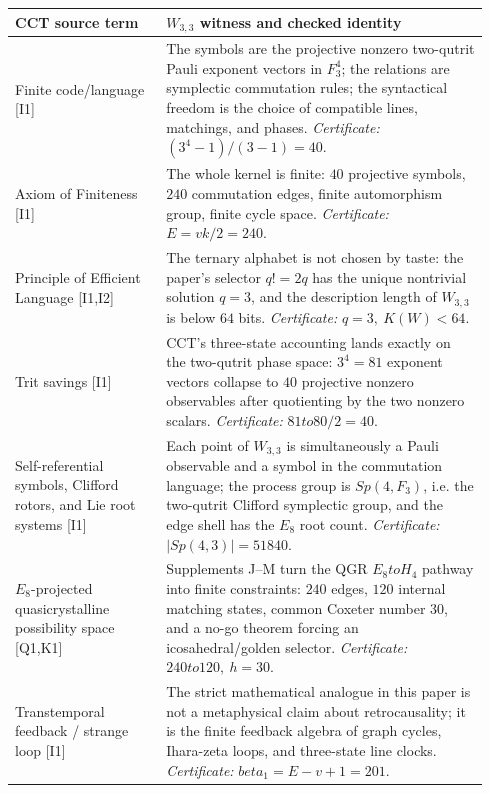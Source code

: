 \documentclass[12pt,a4paper]{article}
\def\mathbb#1{#1}%
\def\mathrm#1{#1}%
\def\beta{beta}%
\def\to{ to }%
\theoremstyle{definition}
\newcommand{\Sp}{\mathrm{Sp}}
\newcommand{\FF}{\mathbb{F}}
\begin{document}
{\small
\renewcommand{\arraystretch}{1.18}
\begin{longtable}{@{}>{\raggedright\arraybackslash}p{0.30\linewidth}>{\raggedright\arraybackslash}p{0.64\linewidth}@{}}
\toprule
CCT source term & $W_{3,3}$ witness and checked identity \\
\midrule \endhead
Finite code/language [I1]
&
The symbols are the projective nonzero two-qutrit Pauli exponent
vectors in $\FF_3^4$; the relations are symplectic commutation rules;
the syntactical freedom is the choice of compatible lines, matchings,
and phases.  \emph{Certificate:} $(3^4-1)/(3-1)=40$. \\

Axiom of Finiteness [I1]
&
The whole kernel is finite: $40$ projective symbols, $240$ commutation
edges, finite automorphism group, finite cycle space.  \emph{Certificate:}
$E=vk/2=240$. \\

Principle of Efficient Language [I1,I2]
&
The ternary alphabet is not chosen by taste: the paper's selector
$q!=2q$ has the unique nontrivial solution $q=3$, and the
description length of $W_{3,3}$ is below $64$ bits.  \emph{Certificate:}
$q=3,\ K(W)<64$. \\

Trit savings [I1]
&
CCT's three-state accounting lands exactly on the two-qutrit phase
space: $3^4=81$ exponent vectors collapse to $40$ projective nonzero
observables after quotienting by the two nonzero scalars.  \emph{Certificate:}
$81\to 80/2=40$. \\

Self-referential symbols, Clifford rotors, and Lie root systems [I1]
&
Each point of $W_{3,3}$ is simultaneously a Pauli observable and a
symbol in the commutation language; the process group is
$\Sp(4,\FF_3)$, i.e. the two-qutrit Clifford symplectic group, and the
edge shell has the $E_8$ root count.  \emph{Certificate:}
$|\Sp(4,3)|=51840$. \\

$E_8$-projected quasicrystalline possibility space [Q1,K1]
&
Supplements J--M turn the QGR $E_8\to H_4$ pathway into finite
constraints: $240$ edges, $120$ internal matching states, common
Coxeter number $30$, and a no-go theorem forcing an icosahedral/golden
selector.  \emph{Certificate:} $240\to 120,\ h=30$. \\

Transtemporal feedback / strange loop [I1]
&
The strict mathematical analogue in this paper is not a metaphysical
claim about retrocausality; it is the finite feedback algebra of graph
cycles, Ihara-zeta loops, and three-state line clocks.  \emph{Certificate:}
$\beta_1=E-v+1=201$. \\
\bottomrule
\end{longtable}
}
\end{document}
